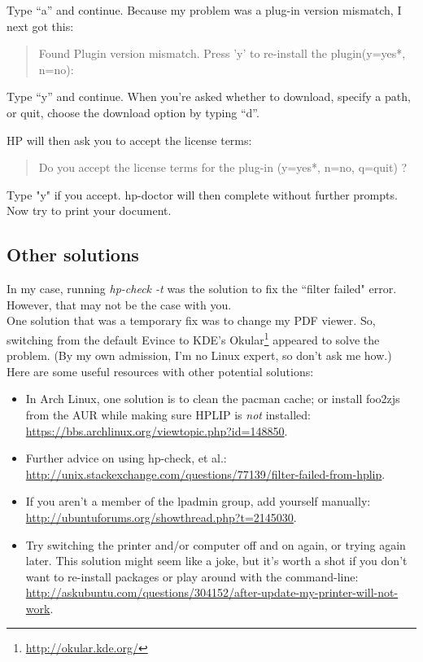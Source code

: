\documentclass[12pt, a4paper]{article}
\begin{document}
\noindent Type “a” and continue. Because my problem was a plug-in version mismatch, I next got this:

\begin{quote}
Found Plugin version mismatch. Press 'y' to re-install the plugin(y=yes*, n=no):
\end{quote}

\noindent Type “y” and continue. When you're asked whether to download, specify a path, or quit, choose the download option by typing “d”.

HP will then ask you to accept the license terms:

\begin{quote}
Do you accept the license terms for the plug-in (y=yes*, n=no, q=quit) ? 
\end{quote}

\noindent Type "y" if you accept. hp-doctor will then complete without further prompts. Now try to print your document.

\subsection*{Other solutions}

In my case, running \emph{hp-check -t} was the solution to fix the ``filter failed" error. However, that may not be the case with you.\\

\noindent One solution that was a temporary fix was to change my PDF viewer. So, switching from the default Evince to KDE's Okular\footnote{\url{http://okular.kde.org/}} appeared to solve the problem. (By my own admission, I'm no Linux expert, so don't ask me how.)\\

\noindent Here are some useful resources with other potential solutions:

\begin{itemize}
\item In Arch Linux, one solution is to clean the pacman cache; or install foo2zjs from the AUR while making sure HPLIP is \emph{not} installed: \url{https://bbs.archlinux.org/viewtopic.php?id=148850}.
\item Further advice on using hp-check, et al.: \url{http://unix.stackexchange.com/questions/77139/filter-failed-from-hplip}.
\item If you aren't a member of the lpadmin group, add yourself manually: \url{http://ubuntuforums.org/showthread.php?t=2145030}.
\item Try switching the printer and/or computer off and on again, or trying again later. This solution might seem like a joke, but it's worth a shot if you don't want to re-install packages or play around with the command-line: \url{http://askubuntu.com/questions/304152/after-update-my-printer-will-not-work}.
\end{itemize}
\end{document}
